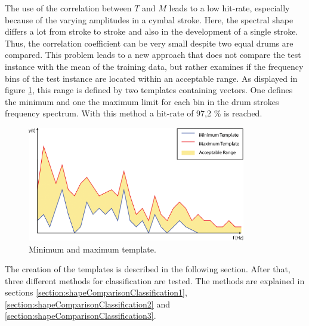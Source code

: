 The use of the correlation between $T$ and $M$ leads to a low hit-rate, especially because of the varying amplitudes in a cymbal stroke. Here, the spectral shape differs a lot from stroke to stroke and also in the development of a single stroke. Thus, the correlation coefficient can be very small despite two equal drums are compared. This problem leads to a new approach that does not compare the test instance with the mean of the training data, but rather examines if the frequency bins of the test instance are located within an acceptable range. As displayed in figure \ref{fig:templates1}, this range is defined by two templates containing vectors. One defines the minimum and one the maximum limit for each bin in the drum strokes frequency spectrum. With this method a hit-rate of 97,2 \% is reached.

\begin{figure}[htb]
	\centering
	\includegraphics[height=5cm]{images/acceptable_range.png}
	\caption{Minimum and maximum template.}
	\label{fig:templates1}
\end{figure}


The creation of the templates is described in the following section. After that, three different methods for classification are tested. The methods are explained in sections \ref{section:shapeComparisonClassification1}, \ref{section:shapeComparisonClassification2} and \ref{section:shapeComparisonClassification3}.


